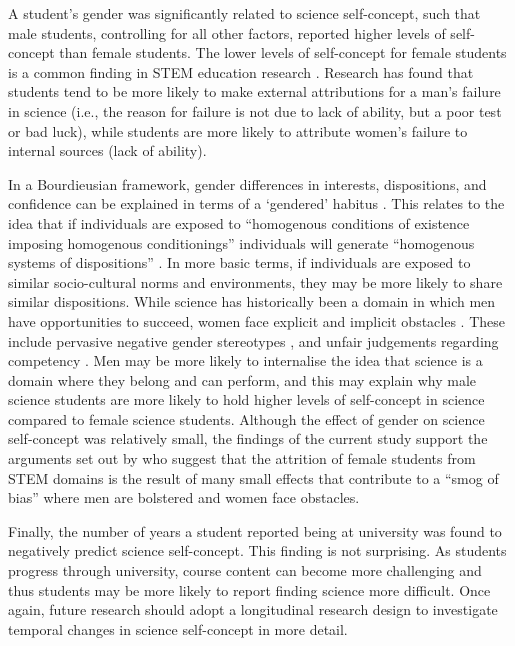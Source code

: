 \documentclass[smallextended]{svjour3}       %
\begin{document}
A student's gender was significantly related to science self-concept, such that male students, controlling for all other factors, reported higher levels of self-concept than female students. The lower levels of self-concept for female students is a common finding in STEM education research \cite{sax2015but,Ellis_2016}. Research has found that students tend to be more likely to make external attributions for a man's failure in science (i.e., the reason for failure is not due to lack of ability, but a poor test or bad luck), while students are more likely to attribute women's failure to internal sources (lack of ability)\cite{LaCosse_2016}. 

In a Bourdieusian framework, gender differences in interests, dispositions, and confidence can be explained in terms of a `gendered' habitus \cite{Reay_2004}. This relates to the idea that if individuals are exposed to ``homogenous conditions of existence imposing homogenous conditionings'' individuals will generate ``homogenous systems of dispositions'' \cite[p.101]{Bourdieu1984}. In more basic terms, if individuals are exposed to similar socio-cultural norms and environments, they may be more likely to share similar dispositions. While science has historically been a domain in which men have opportunities to succeed, women face explicit and implicit obstacles \cite{cheryan2017some,Blickenstaff_2005}. These include pervasive negative gender stereotypes \cite{Nosek_2009}, and unfair judgements regarding competency \cite{Moss_2012,Barthelemy_2016}. Men may be more likely to internalise the idea that science is a domain where they belong and can perform, and this may explain why male science students are more likely to hold higher levels of self-concept in science compared to female science students. Although the effect of gender on science self-concept was relatively small, the findings of the current study support the arguments set out by \cite{Kost_Smith_2010} who suggest that the attrition of female students from STEM domains is the result of many small effects that contribute to a ``smog of bias'' where men are bolstered and women face obstacles. 

Finally, the number of years a student reported being at university was found to negatively predict science self-concept. This finding is not surprising. As students progress through university, course content can become more challenging and thus students may be more likely to report finding science more difficult. Once again, future research should adopt a longitudinal research design to investigate temporal changes in science self-concept in more detail. 
\end{document}
